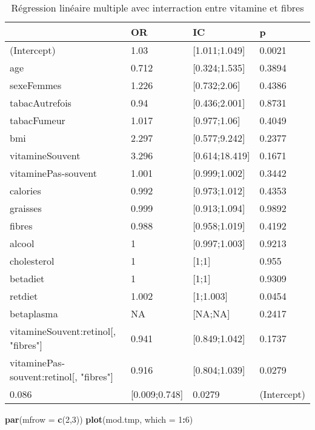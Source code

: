 \documentclass[]{article}
\newenvironment{Shaded}{\begin{snugshade}}{\end{snugshade}}
\newcommand{\KeywordTok}[1]{\textcolor[rgb]{0.13,0.29,0.53}{\textbf{#1}}}
\newcommand{\DataTypeTok}[1]{\textcolor[rgb]{0.13,0.29,0.53}{#1}}
\newcommand{\DecValTok}[1]{\textcolor[rgb]{0.00,0.00,0.81}{#1}}
\newcommand{\OperatorTok}[1]{\textcolor[rgb]{0.81,0.36,0.00}{\textbf{#1}}}
\newcommand{\NormalTok}[1]{#1}
\begin{document}
\begin{table}

\caption{\label{tab:unnamed-chunk-87}Régression linéaire multiple avec interraction entre vitamine et fibres}
\centering
\begin{tabular}[t]{l|l|l|l}
\hline
  & OR & IC & p\\
\hline
\rowcolor[HTML]{BBD2E1}  (Intercept) & 1.03 & [1.011;1.049] & 0.0021\\
\hline
age & 0.712 & [0.324;1.535] & 0.3894\\
\hline
\rowcolor[HTML]{BBD2E1}  sexeFemmes & 1.226 & [0.732;2.06] & 0.4386\\
\hline
tabacAutrefois & 0.94 & [0.436;2.001] & 0.8731\\
\hline
\rowcolor[HTML]{BBD2E1}  tabacFumeur & 1.017 & [0.977;1.06] & 0.4049\\
\hline
bmi & 2.297 & [0.577;9.242] & 0.2377\\
\hline
\rowcolor[HTML]{BBD2E1}  vitamineSouvent & 3.296 & [0.614;18.419] & 0.1671\\
\hline
vitaminePas-souvent & 1.001 & [0.999;1.002] & 0.3442\\
\hline
\rowcolor[HTML]{BBD2E1}  calories & 0.992 & [0.973;1.012] & 0.4353\\
\hline
graisses & 0.999 & [0.913;1.094] & 0.9892\\
\hline
\rowcolor[HTML]{BBD2E1}  fibres & 0.988 & [0.958;1.019] & 0.4192\\
\hline
alcool & 1 & [0.997;1.003] & 0.9213\\
\hline
\rowcolor[HTML]{BBD2E1}  cholesterol & 1 & [1;1] & 0.955\\
\hline
betadiet & 1 & [1;1] & 0.9309\\
\hline
\rowcolor[HTML]{BBD2E1}  retdiet & 1.002 & [1;1.003] & 0.0454\\
\hline
betaplasma & NA & [NA;NA] & 0.2417\\
\hline
\rowcolor[HTML]{BBD2E1}  vitamineSouvent:retinol[, "fibres"] & 0.941 & [0.849;1.042] & 0.1737\\
\hline
vitaminePas-souvent:retinol[, "fibres"] & 0.916 & [0.804;1.039] & 0.0279\\
\hline
\rowcolor[HTML]{BBD2E1}  0.086 & [0.009;0.748] & 0.0279 & (Intercept)\\
\hline
\end{tabular}
\end{table}

\begin{Shaded}
\begin{Highlighting}[]
\KeywordTok{par}\NormalTok{(}\DataTypeTok{mfrow =} \KeywordTok{c}\NormalTok{(}\DecValTok{2}\NormalTok{,}\DecValTok{3}\NormalTok{))}
\KeywordTok{plot}\NormalTok{(mod.tmp, }\DataTypeTok{which =} \DecValTok{1}\OperatorTok{:}\DecValTok{6}\NormalTok{)}
\end{Highlighting}
\end{Shaded}
\end{document}
